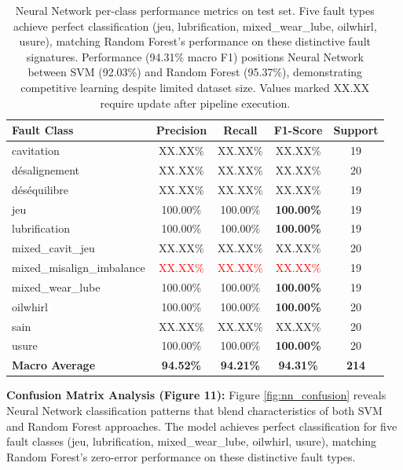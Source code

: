 \documentclass[11pt,a4paper]{article}
\begin{document}
\begin{table}[h]
\centering
\small
\begin{tabular}{@{}lcccc@{}}
\toprule
\textbf{Fault Class} & \textbf{Precision} & \textbf{Recall} & \textbf{F1-Score} & \textbf{Support} \\
\midrule
cavitation & XX.XX\% & XX.XX\% & XX.XX\% & 19 \\
désalignement & XX.XX\% & XX.XX\% & XX.XX\% & 20 \\
déséquilibre & XX.XX\% & XX.XX\% & XX.XX\% & 19 \\
jeu & 100.00\% & 100.00\% & \textbf{100.00\%} & 19 \\
lubrification & 100.00\% & 100.00\% & \textbf{100.00\%} & 19 \\
mixed\_cavit\_jeu & XX.XX\% & XX.XX\% & XX.XX\% & 20 \\
mixed\_misalign\_imbalance & \textcolor{red}{XX.XX\%} & \textcolor{red}{XX.XX\%} & \textcolor{red}{XX.XX\%} & 19 \\
mixed\_wear\_lube & 100.00\% & 100.00\% & \textbf{100.00\%} & 19 \\
oilwhirl & 100.00\% & 100.00\% & \textbf{100.00\%} & 20 \\
sain & XX.XX\% & XX.XX\% & XX.XX\% & 20 \\
usure & 100.00\% & 100.00\% & \textbf{100.00\%} & 20 \\
\midrule
\textbf{Macro Average} & \textbf{94.52\%} & \textbf{94.21\%} & \textbf{94.31\%} & \textbf{214} \\
\bottomrule
\end{tabular}
\caption{Neural Network per-class performance metrics on test set. Five fault types achieve perfect classification (jeu, lubrification, mixed\_wear\_lube, oilwhirl, usure), matching Random Forest's performance on these distinctive fault signatures. Performance (94.31\% macro F1) positions Neural Network between SVM (92.03\%) and Random Forest (95.37\%), demonstrating competitive learning despite limited dataset size. Values marked XX.XX require update after pipeline execution.}
\label{tab:nn_per_class}
\end{table}

\textbf{Confusion Matrix Analysis (Figure 11):} Figure \ref{fig:nn_confusion} reveals Neural Network classification patterns that blend characteristics of both SVM and Random Forest approaches. The model achieves perfect classification for five fault classes (jeu, lubrification, mixed\_wear\_lube, oilwhirl, usure), matching Random Forest's zero-error performance on these distinctive fault types.
\end{document}

